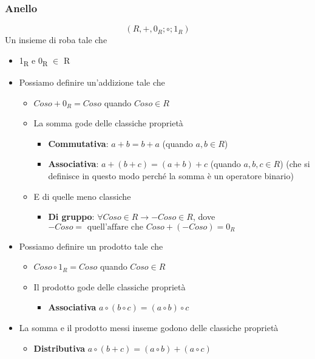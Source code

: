 \documentclass[11pt]{article}
\begin{document}
\subsubsection{Anello}
\label{sec:orgaf9606b}
\[ (R,+,0_R;\circ ; 1_R) \]
Un insieme di roba tale che
\begin{itemize}
\item 1\textsubscript{R} e 0\textsubscript{R} \(\in\) R
\item Possiamo definire un'addizione tale che
\begin{itemize}
\item \(Coso + 0_R = Coso\) quando \(Coso \in R\)
\item La somma gode delle classiche proprietà
\begin{itemize}
\item \textbf{Commutativa}: \(a + b = b + a\) (quando \(a,b \in R\))
\item \textbf{Associativa}: \(a + (b + c) = (a + b) + c\) (quando \(a,b,c \in R\))
(che si definisce in questo modo perché la somma è un
operatore binario)
\end{itemize}
\item E di quelle meno classiche
\begin{itemize}
\item \textbf{Di gruppo}: \(\forall Coso \in R \to -Coso \in R\), dove
\(-Coso = \text{ quell'affare che } Coso + (-Coso) = 0_R\)
\end{itemize}
\end{itemize}
\item Possiamo definire un prodotto tale che
\begin{itemize}
\item \(Coso \circ 1_R = Coso\) quando \(Coso \in R\)
\item Il prodotto gode delle classiche proprietà
\begin{itemize}
\item \textbf{Associativa} \(a \circ (b \circ c) = (a \circ b) \circ c\)
\end{itemize}
\end{itemize}
\item La somma e il prodotto messi inseme godono delle classiche proprietà
\begin{itemize}
\item \textbf{Distributiva} \(a \circ (b + c) = (a \circ b) + (a \circ c)\)
\end{itemize}
\end{itemize}
\end{document}
